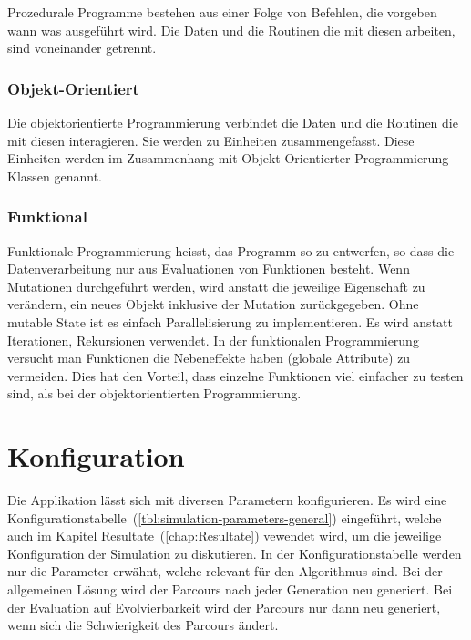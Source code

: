         Prozedurale Programme bestehen aus einer Folge von Befehlen,
        die vorgeben wann was ausgeführt wird.
        Die Daten und die Routinen die mit diesen arbeiten, sind voneinander getrennt.

      \subsubsection{Objekt-Orientiert\label{subsub:TechnologyParadigmaObjectOriented}}

        Die objektorientierte Programmierung verbindet die Daten und
        die Routinen die mit diesen interagieren. Sie werden zu Einheiten zusammengefasst.
        Diese Einheiten werden im Zusammenhang mit Objekt-Orientierter-Programmierung Klassen genannt.

      \subsubsection{Funktional\label{subsub:TechnologyParadigmaFunctional}}

        Funktionale Programmierung heisst, das Programm so zu entwerfen, so dass die Datenverarbeitung nur aus Evaluationen von Funktionen besteht.
        Wenn Mutationen durchgeführt werden, wird anstatt die jeweilige Eigenschaft zu verändern,
        ein neues Objekt inklusive der Mutation zurückgegeben. Ohne mutable State ist es einfach Parallelisierung zu implementieren.
        Es wird anstatt Iterationen, Rekursionen verwendet.
        In der funktionalen Programmierung versucht man Funktionen die Nebeneffekte haben (globale Attribute) zu vermeiden.
        Dies hat den Vorteil, dass einzelne Funktionen viel einfacher zu testen sind, als bei der objektorientierten Programmierung.

  \section{Konfiguration\label{sec:Konfiguration}}

    Die Applikation lässt sich mit diversen Parametern konfigurieren.
    Es wird eine Konfigurationstabelle~(\vref{tbl:simulation-parameters-general}) eingeführt,
    welche auch im Kapitel Resultate~(\vref{chap:Resultate}) vewendet wird,
    um die jeweilige Konfiguration der Simulation zu diskutieren. In der Konfigurationstabelle werden nur die Parameter erwähnt,
    welche relevant für den Algorithmus sind. Bei der allgemeinen Lösung wird der Parcours
    nach jeder Generation neu generiert. Bei der Evaluation auf Evolvierbarkeit
    wird der Parcours nur dann neu generiert, wenn sich die Schwierigkeit des Parcours ändert.

